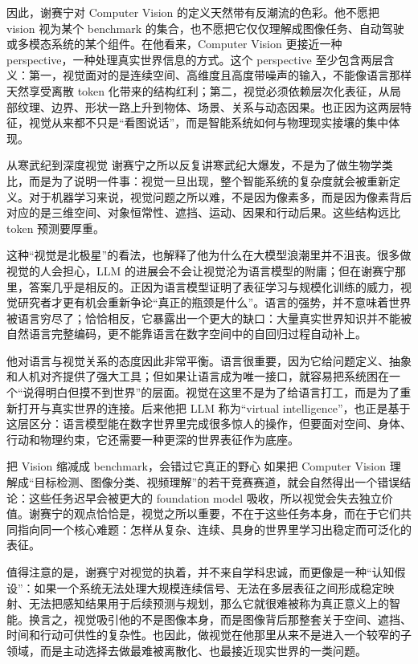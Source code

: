 \documentclass[a4paper,12pt]{article}
\begin{document}
因此，谢赛宁对 Computer Vision 的定义天然带有反潮流的色彩。他不愿把 vision 视为某个 benchmark 的集合，也不愿把它仅仅理解成图像任务、自动驾驶或多模态系统的某个组件。在他看来，Computer Vision 更接近一种 perspective，一种处理真实世界信息的方式。这个 perspective 至少包含两层含义：第一，视觉面对的是连续空间、高维度且高度带噪声的输入，不能像语言那样天然享受离散 token 化带来的结构红利；第二，视觉必须依赖层次化表征，从局部纹理、边界、形状一路上升到物体、场景、关系与动态因果。也正因为这两层特征，视觉从来都不只是“看图说话”，而是智能系统如何与物理现实接壤的集中体现。

\begin{knowledgebox}{从寒武纪到深度视觉}
谢赛宁之所以反复讲寒武纪大爆发，不是为了做生物学类比，而是为了说明一件事：视觉一旦出现，整个智能系统的复杂度就会被重新定义。对于机器学习来说，视觉问题之所以难，不是因为像素多，而是因为像素背后对应的是三维空间、对象恒常性、遮挡、运动、因果和行动后果。这些结构远比 token 预测要厚重。
\end{knowledgebox}

这种“视觉是北极星”的看法，也解释了他为什么在大模型浪潮里并不沮丧。很多做视觉的人会担心，LLM 的进展会不会让视觉沦为语言模型的附庸；但在谢赛宁那里，答案几乎是相反的。正因为语言模型证明了表征学习与规模化训练的威力，视觉研究者才更有机会重新争论“真正的瓶颈是什么”。语言的强势，并不意味着世界被语言穷尽了；恰恰相反，它暴露出一个更大的缺口：大量真实世界知识并不能被自然语言完整编码，更不能靠语言在数字空间中的自回归过程自动补上。

他对语言与视觉关系的态度因此非常平衡。语言很重要，因为它给问题定义、抽象和人机对齐提供了强大工具；但如果让语言成为唯一接口，就容易把系统困在一个“说得明白但摸不到世界”的层面。视觉在这里不是为了给语言打工，而是为了重新打开与真实世界的连接。后来他把 LLM 称为“virtual intelligence”，也正是基于这层区分：语言模型能在数字世界里完成很多惊人的操作，但要面对空间、身体、行动和物理约束，它还需要一种更深的世界表征作为底座。

\begin{warningbox}{把 Vision 缩减成 benchmark，会错过它真正的野心}
如果把 Computer Vision 理解成“目标检测、图像分类、视频理解”的若干竞赛赛道，就会自然得出一个错误结论：这些任务迟早会被更大的 foundation model 吸收，所以视觉会失去独立价值。谢赛宁的观点恰恰是，视觉之所以重要，不在于这些任务本身，而在于它们共同指向同一个核心难题：怎样从复杂、连续、具身的世界里学习出稳定而可泛化的表征。
\end{warningbox}

值得注意的是，谢赛宁对视觉的执着，并不来自学科忠诚，而更像是一种“认知假设”：如果一个系统无法处理大规模连续信号、无法在多层表征之间形成稳定映射、无法把感知结果用于后续预测与规划，那么它就很难被称为真正意义上的智能。换言之，视觉吸引他的不是图像本身，而是图像背后那整套关于空间、遮挡、时间和行动可供性的复杂性。也因此，做视觉在他那里从来不是进入一个较窄的子领域，而是主动选择去做最难被离散化、也最接近现实世界的一类问题。
\end{document}
